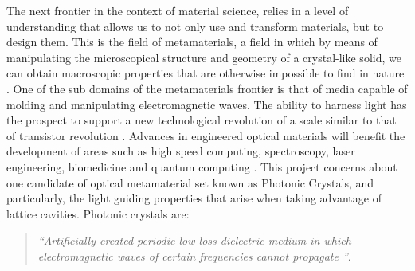 The next frontier in the context of material science, relies in a level of understanding that allows us to not only use and transform materials, but to design them. This is the field of metamaterials, a field in which by means of manipulating the microscopical structure and geometry of a crystal-like solid, we can obtain macroscopic properties that are otherwise impossible to find in nature \cite{Engheta2006, Capoliono2009}. One of the sub domains of the metamaterials frontier is that of media capable of molding and manipulating electromagnetic waves. The ability to harness light has the prospect to support a new technological revolution of a scale similar to that of transistor revolution \cite{Joannopoulos2008}.
Advances in engineered optical materials will benefit the development of areas such as high speed computing, spectroscopy, laser engineering, biomedicine and quantum computing \cite{Obayya2011}. 
This project concerns about one candidate of optical metamaterial set known as Photonic Crystals, and particularly, the light guiding properties that arise when taking advantage of lattice cavities.
Photonic crystals are: 

\begin{quote}
\textit{``Artificially created periodic low-loss dielectric medium in which electromagnetic waves of certain frequencies cannot propagate ''}\cite{GangBao1987}.  
\end{quote} 

